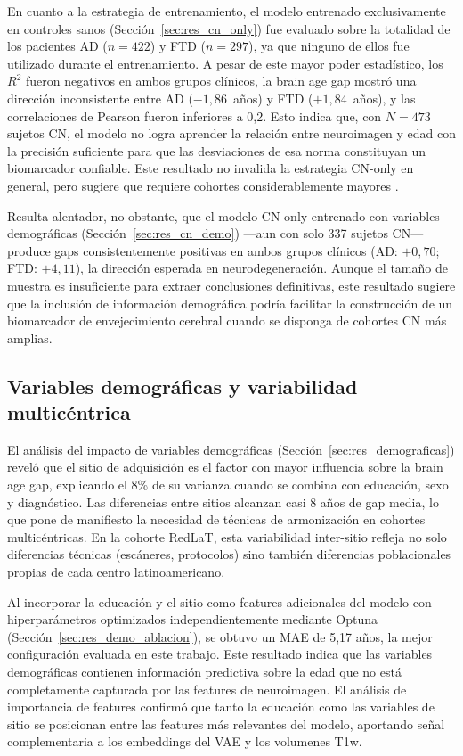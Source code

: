 En cuanto a la estrategia de entrenamiento, el modelo entrenado exclusivamente en controles sanos (Sección~\ref{sec:res_cn_only}) fue evaluado sobre la totalidad de los pacientes AD ($n = 422$) y FTD ($n = 297$), ya que ninguno de ellos fue utilizado durante el entrenamiento. A pesar de este mayor poder estadístico, los $R^2$ fueron negativos en ambos grupos clínicos, la brain age gap mostró una dirección inconsistente entre AD ($-1{,}86$~años) y FTD ($+1{,}84$~años), y las correlaciones de Pearson fueron inferiores a 0,2. Esto indica que, con $N = 473$ sujetos CN, el modelo no logra aprender la relación entre neuroimagen y edad con la precisión suficiente para que las desviaciones de esa norma constituyan un biomarcador confiable. Este resultado no invalida la estrategia CN-only en general, pero sugiere que requiere cohortes considerablemente mayores \cite{smith2019estimation}.

Resulta alentador, no obstante, que el modelo CN-only entrenado con variables demográficas (Sección~\ref{sec:res_cn_demo}) ---aun con solo 337 sujetos CN--- produce gaps consistentemente positivas en ambos grupos clínicos (AD: $+0{,}70$; FTD: $+4{,}11$), la dirección esperada en neurodegeneración. Aunque el tamaño de muestra es insuficiente para extraer conclusiones definitivas, este resultado sugiere que la inclusión de información demográfica podría facilitar la construcción de un biomarcador de envejecimiento cerebral cuando se disponga de cohortes CN más amplias.

\subsection{Variables demográficas y variabilidad multicéntrica}

El análisis del impacto de variables demográficas (Sección~\ref{sec:res_demograficas}) reveló que el sitio de adquisición es el factor con mayor influencia sobre la brain age gap, explicando el 8\% de su varianza cuando se combina con educación, sexo y diagnóstico. Las diferencias entre sitios alcanzan casi 8 años de gap media, lo que pone de manifiesto la necesidad de técnicas de armonización en cohortes multicéntricas. En la cohorte RedLaT, esta variabilidad inter-sitio refleja no solo diferencias técnicas (escáneres, protocolos) sino también diferencias poblacionales propias de cada centro latinoamericano.

Al incorporar la educación y el sitio como features adicionales del modelo con hiperparámetros optimizados independientemente mediante Optuna (Sección~\ref{sec:res_demo_ablacion}), se obtuvo un MAE de 5,17 años, la mejor configuración evaluada en este trabajo. Este resultado indica que las variables demográficas contienen información predictiva sobre la edad que no está completamente capturada por las features de neuroimagen. El análisis de importancia de features confirmó que tanto la educación como las variables de sitio se posicionan entre las features más relevantes del modelo, aportando señal complementaria a los embeddings del VAE y los volumenes T1w.

